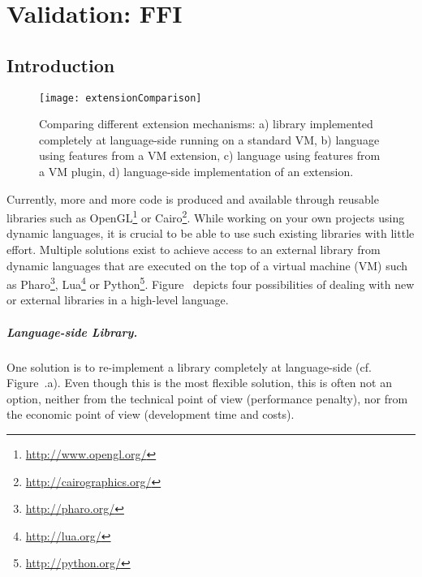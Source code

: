 

\chapter{Validation: FFI}
\minitoc

\section{Introduction}

\begin{figure*}[ht]
	\centering
	\texttt{[image: extensionComparison]}
	\caption{Comparing different extension mechanisms: a) library implemented completely at language-side running on a standard VM, b) language using features from a VM extension, c) language using features from a VM plugin, d) language-side implementation of an extension.}
\end{figure*}

Currently, more and more code is produced and available through reusable libraries such as OpenGL\footnote{\url{http://www.opengl.org/}} or Cairo\footnote{\url{http://cairographics.org/}}.
While working on your own projects using dynamic languages, it is crucial to be able to use such existing libraries with little effort.
Multiple solutions exist to achieve access to an external library from dynamic languages that are executed on the top of a virtual machine (VM) such as Pharo\footnote{\url{http://pharo.org/}}, Lua\footnote{\url{http://lua.org/}} or Python\footnote{\url{http://python.org/}}.
Figure~ depicts four possibilities of dealing with new or external libraries in a high-level language.

\paragraph{Language-side Library.}
One solution is to re-implement a library completely at language-side (cf. Figure~.a).
Even though this is the most flexible solution, this is often not an option, neither from the technical point of view (performance penalty), nor from the economic point of view (development time and costs).

